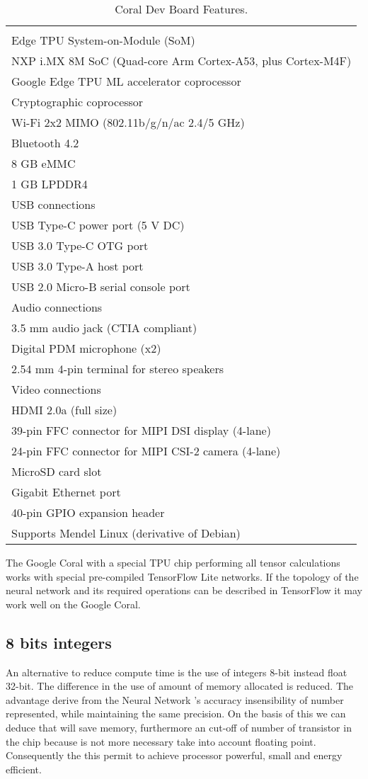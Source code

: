 \begin{table}[htb]
	\centering
	\begin{tabular}{l}
		\hline \\
		Edge TPU System-on-Module (SoM)\\
		NXP i.MX 8M SoC (Quad-core Arm Cortex-A53, plus Cortex-M4F)\\
		Google Edge TPU ML accelerator coprocessor\\
		Cryptographic coprocessor\\
		Wi-Fi 2x2 MIMO (802.11b/g/n/ac 2.4/5 GHz)\\
		Bluetooth 4.2\\
		8 GB eMMC\\
		1 GB LPDDR4\\
		USB connections\\
		USB Type-C power port (5 V DC)\\
		USB 3.0 Type-C OTG port\\
		USB 3.0 Type-A host port\\
		USB 2.0 Micro-B serial console port\\
		Audio connections\\
		3.5 mm audio jack (CTIA compliant)\\
		Digital PDM microphone (x2)\\
		2.54 mm 4-pin terminal for stereo speakers\\
		Video connections\\
		HDMI 2.0a (full size)\\
		39-pin FFC connector for MIPI DSI display (4-lane)\\
		24-pin FFC connector for MIPI CSI-2 camera (4-lane)\\
		MicroSD card slot\\
		Gigabit Ethernet port\\
		40-pin GPIO expansion header\\
		Supports Mendel Linux (derivative of Debian)\\
		\hline
	\end{tabular}
	\caption{Coral Dev Board Features.}
	\label{tab:hard-devboard-spec}
\end{table}
%
\noindent The Google Coral with a special TPU chip performing all tensor
calculations works with special pre-compiled TensorFlow Lite networks. 
If the topology of the neural network and its required operations can be
described in TensorFlow it may work well on the Google Coral.

\subsection{8 bits integers}
\label{ssec:8-bits.integers}
An alternative to reduce compute time is the use of integers 8-bit instead float
32-bit.
The difference in the use of amount of memory allocated is reduced.
The advantage derive from the Neural Network 's accuracy insensibility of number
represented, while maintaining the same precision. On the basis of this we can
deduce that will save memory, furthermore an cut-off of number of transistor in
the chip because is not more necessary take into account floating point.
Consequently the this permit to achieve processor powerful, small and energy
efficient.
